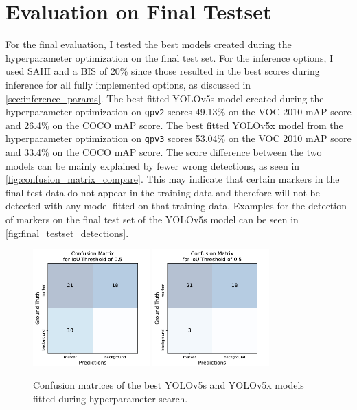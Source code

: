 \documentclass[10pt]{book}
\newcommand{\figureref}[1]{\autoref{#1}}
\begin{document}
\section{Evaluation on Final Testset}
\label{sec:final_eval}

For the final evaluation, I tested the best models created during the hyperparameter optimization on the final test set. For the inference options, I used \ac{SAHI} and a \ac{BIS} of 20\% since those resulted in the best scores during inference for all fully implemented options, as discussed in \autoref{sec:inference_params}.
The best fitted \ac{YOLO}v5s model created during the hyperparameter optimization on \texttt{gpv2} scores 49.13\% on the VOC 2010 \ac{mAP} score and 26.4\% on the \ac{COCO} \ac{mAP} score. The best fitted \ac{YOLO}v5x model from the hyperparameter optimization on \texttt{gpv3} scores 53.04\% on the VOC 2010 \ac{mAP} score and 33.4\% on the \ac{COCO} \ac{mAP} score. The score difference between the two models can be mainly explained by fewer wrong detections, as seen in \figureref{fig:confusion_matrix_compare}. This may indicate that certain markers in the final test data do not appear in the training data and therefore will not be detected with any model fitted on that training data. Examples for the detection of markers on the final test set of the \ac{YOLO}v5s model can be seen in \figureref{fig:final_testset_detections}.

\begin{figure} %
  \centering
     {\includegraphics[width=0.4\textwidth]{image/yolov5s_hyp_search_confusion_matrix}}
     {\includegraphics[width=0.4\textwidth]{image/yolov5x_hyp_search_confusion_matrix}}
  \caption{Confusion matrices of the best \ac{YOLO}v5s and \ac{YOLO}v5x models fitted during hyperparameter search.}
  \label{fig:confusion_matrix_compare}
\end{figure}
\end{document}
